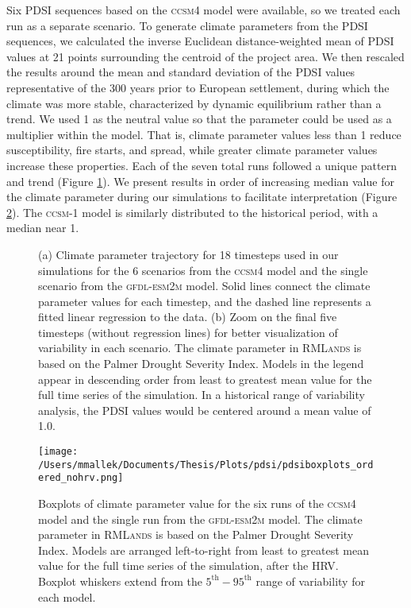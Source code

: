 Six PDSI sequences based on the \textsc{ccsm4} model were available, so we treated each run as a separate scenario. To generate climate parameters from the PDSI sequences, we calculated the inverse Euclidean distance-weighted mean of PDSI values at 21 points surrounding the centroid of the project area. We then rescaled the results around the mean and standard deviation of the PDSI values representative of the 300 years prior to European settlement, during which the climate was more stable, characterized by dynamic equilibrium rather than a trend. We used 1 as the neutral value so that the parameter could be used as a multiplier within the model. That is, climate parameter values less than 1 reduce susceptibility, fire starts, and spread, while greater climate parameter values increase these properties. Each of the seven total runs followed a unique pattern and trend (Figure \ref{fig:pdsi_future}). We present results in order of increasing median value for the climate parameter during our simulations to facilitate interpretation (Figure \ref{pdsi-boxplots}). The \textsc{ccsm-1} model is similarly distributed to the historical period, with a median near 1.


\begin{figure}[!htbp]
\centering
    \caption{(a) Climate parameter trajectory for 18 timesteps used in our simulations for the 6 scenarios from the \textsc{ccsm4} model and the single scenario from the \textsc{gfdl-esm2m} model. Solid lines connect the climate parameter values for each timestep, and the dashed line represents a fitted linear regression to the data. (b) Zoom on the final five timesteps (without regression lines) for better visualization of variability in each scenario. The climate parameter in \textsc{RMLands} is based on the Palmer Drought Severity Index. Models in the legend appear in descending order from least to greatest mean value for the full time series of the simulation. In a historical range of variability analysis, the PDSI values would be centered around a mean value of 1.0.}
\label{fig:pdsi_future}

\end{figure}

\begin{figure}[!htbp]
\centering
\texttt{[image: /Users/mmallek/Documents/Thesis/Plots/pdsi/pdsiboxplots\_ordered\_nohrv.png]}
\caption{Boxplots of climate parameter value for the six runs of the \textsc{ccsm4} model and the single run from the \textsc{gfdl-esm2m} model. The climate parameter in \textsc{RMLands} is based on the Palmer Drought Severity Index. Models are arranged left-to-right from least to greatest mean value for the full time series of the simulation, after the HRV. Boxplot whiskers extend from the $5^{\text{th}}-95^{\text{th}}$ range of variability for each model.}
\label{pdsi-boxplots}
\end{figure}


